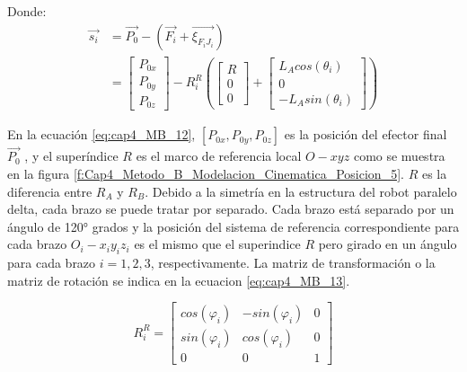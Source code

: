     Donde: 
    \begin{align}
        \overrightarrow{s_{i}} & = \overrightarrow{P_{0}}- \left(\overrightarrow{F_{i}}+\overrightarrow{\xi_{F_{i}J_{i}}} \right)\\&= 
            \begin{bmatrix}
                P_{0x} \\
                P_{0y} \\
                P_{0z}
            \end{bmatrix} -  R_{i}^{R}
            \left( 
            \begin{bmatrix}
                R \\
                0\\
                0
            \end{bmatrix} + 
            \begin{bmatrix}
                L_{A} cos(\theta_i) \\
                0\\
                -L_{A} sin(\theta_i) 
            \end{bmatrix}
            \right)
        \label{eq:cap4_MB_12}
    \end{align}


    En la ecuación \ref{eq:cap4_MB_12}, $[P_{0x},P_{0y},P_{0z}]$ es la posición del efector final $\overrightarrow{P_{0}}$ , y el superíndice $R$ es el marco de referencia local $O-xyz$ como se muestra en la figura \ref{f:Cap4_Metodo_B_Modelacion_Cinematica_Posicion_5}. $R$ es la diferencia entre ${R}_{A}$ y ${R}_{B}$.
    Debido a la simetría en la estructura del robot paralelo delta, cada brazo se puede tratar por separado. Cada brazo está separado por un ángulo de 120° grados y la posición del sistema de referencia correspondiente para cada brazo $O_i - x_i y_i z_i$  es el mismo que el superindice $R$ pero girado en un ángulo para cada brazo $i={1,2 ,3}$, respectivamente. 
    La matriz de transformación  o  la  matriz de rotación se indica en la ecuacion \ref{eq:cap4_MB_13}.
    
       \begin{equation}
         R_{i}^{R} =
        \begin{bmatrix}
                cos(\varphi_i)&-sin(\varphi_i)&0 \\
                sin(\varphi_i)&cos(\varphi_i)&0 \\
                0&0&1
            \end{bmatrix}
        \label{eq:cap4_MB_13}
    \end{equation}  
    
